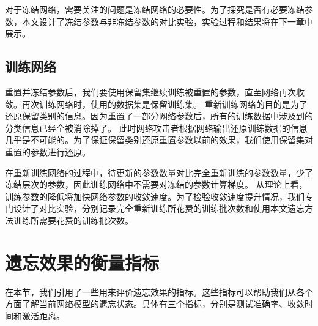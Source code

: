 对于冻结网络，需要关注的问题是冻结网络的必要性。为了探究是否有必要冻结参数，本文设计了冻结参数与非冻结参数的对比实验，实验过程和结果将在下一章中展示。

\subsection{训练网络}
重置并冻结参数后，我们要使用保留集继续训练被重置的参数，直至网络再次收敛。再次训练网络时，使用的数据集是保留训练集。
重新训练网络的目的是为了还原保留类别的信息。因为重置了一部分网络参数后，所有的训练数据中涉及到的分类信息已经全被消除掉了。
此时网络攻击者根据网络输出还原训练数据的信息几乎是不可能的。为了保证保留类别还原重置参数以前的效果，我们使用保留集对重置的参数进行还原。

在重新训练网络的过程中，待更新的参数数量对比完全重新训练的参数数量，少了冻结层次的参数，因此训练网络中不需要对冻结的参数计算梯度。
从理论上看，训练参数的降低将加快网络参数的收敛速度。为了检验收敛速度提升情况，我们专门设计了对比实验，分别记录完全重新训练所花费的训练批次数和使用本文遗忘方法训练所需要花费的训练批次数。

\section{遗忘效果的衡量指标} \label{forget_evaluation_index}
在本节，我们引用了一些用来评价遗忘效果的指标。这些指标可以帮助我们从各个方面了解当前网络模型的遗忘状态。具体有三个指标，分别是测试准确率、收敛时间和激活距离。

